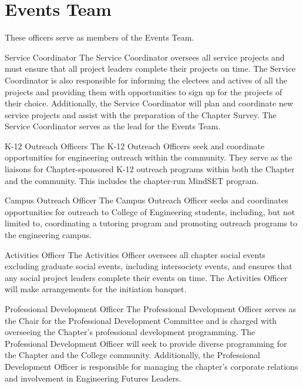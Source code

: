 \section{Events Team}
These officers serve as members of the Events Team.
\begin{enumsubsection}
\item{Service Coordinator}
The Service Coordinator oversees all service projects and must ensure that all project leaders complete their projects on time.
The Service Coordinator is also responsible for informing the electees and actives of all the projects and providing them with opportunities to sign up for the projects of their choice.
Additionally, the Service Coordinator will plan and coordinate new service projects and assist with the preparation of the Chapter Survey.
The Service Coordinator serves as the lead for the Events Team.

\item{K-12 Outreach Officers}
The K-12 Outreach Officers seek and coordinate opportunities for engineering outreach within the community.
They serve as the liaisons for Chapter-sponsored K-12 outreach programs within both the Chapter and the community.
This includes the chapter-run MindSET program.

\item{Campus Outreach Officer}
The Campus Outreach Officer seeks and coordinates opportunities for outreach to College of Engineering students, including, 
but not limited to, coordinating a tutoring program and promoting outreach programs to the engineering campus.


\item{Activities Officer}
The Activities Officer oversees all chapter social events excluding graduate social events, including intersociety events, and ensures that any social project leaders complete their events on time.
The Activities Officer will make arrangements for the initiation banquet.

\item{Professional Development Officer}
The Professional Development Officer serves as the Chair for the Professional Development Committee and is charged with overseeing the Chapter's professional development programming.
The Professional Development Officer will seek to provide diverse programming for the Chapter and the College community.
Additionally, the Professional Development Officer is responsible for managing the chapter’s corporate relations and involvement in Engineering Futures Leaders.
\end{enumsubsection}

